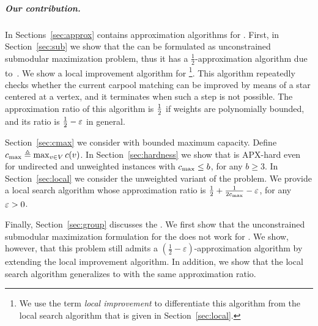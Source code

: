 
\subparagraph{Our contribution.}
%
In Sections~\ref{sec:approx} contains approximation algorithms
for \carpool.  First, in Section~\ref{sec:sub} we show that
the \carpool can be formulated as unconstrained submodular
maximization problem, thus it has a $\frac{1}{2}$-approximation
algorithm due to~\cite{BFNS15,buchbinder2016deterministic}.
%
We show a local improvement algorithm for \carpool%
\footnote{We use the term \emph{local improvement} to differentiate
this algorithm from the local search algorithm that is given in
Section~\ref{sec:local}.}.
%
This algorithm repeatedly checks whether the current carpool matching
can be improved by means of a star centered at a vertex, and it
terminates when such a step is not possible.
%
The approximation ratio of this algorithm is $\frac{1}{2}$ if weights are
polynomially bounded, and its ratio is $\frac{1}{2}-\varepsilon$ in general.

Section~\ref{sec:cmax} we consider \carpool with bounded maximum
capacity.   Define $c_{\max} \triangleq \max_{v \in V} c(v)$.
%
In Section~\ref{sec:hardness} we show that \carpool is APX-hard even
for undirected and unweighted instances with $c_{\max} \leq b$, for any
$b \geq 3$.
%
In Section~\ref{sec:local} we consider the unweighted variant of the
problem.  We provide a local search algorithm whose approximation
ratio is $\frac{1}{2} + \frac{1}{2c_{\max}} - \varepsilon$, for any $\varepsilon>0$.


Finally, Section~\ref{sec:group} discusses the \gcp.  We first show that
the unconstrained submodular maximization formulation for the \carpool
does not work for \gcp.  We show, however, that this problem still
admits a $(\frac{1}{2} -\varepsilon)$-approximation algorithm by
extending the local improvement algorithm.  In addition, we show that
the local search algorithm generalizes to \gcp with the same
approximation ratio.
